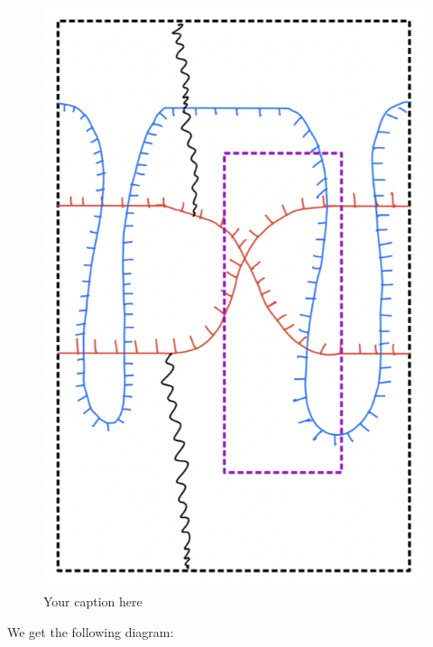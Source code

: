 \begin{figure}[H] %
    \centering
    \includegraphics[scale = 0.95]{diagrams/lemma10/7.png} %
    \caption{Your caption here}
    \label{fig:your-label}
\end{figure}

We get the following diagram:


